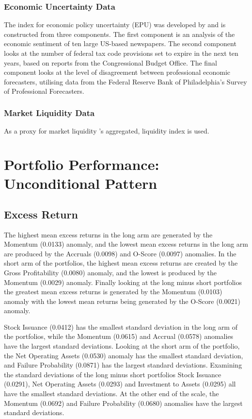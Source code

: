 \documentclass[12pt, a4paper, oneside]{article}
\begin{document}
\subsubsection{Economic Uncertainty Data}
The index for economic policy uncertainty (EPU) was developed by  and is constructed from three components. The first component is an analysis of the economic sentiment of ten large US-based newspapers. The second component looks at the number of federal tax code provisions set to expire in the next ten years, based on reports from the Congressional Budget Office. The final component looks at the level of disagreement between professional economic forecasters, utilising data from the Federal Reserve Bank of Philadelphia's Survey of Professional Forecasters.

\subsubsection{Market Liquidity Data}
As a proxy for market liquidity 's aggregated, liquidity index is used. 


\section{Portfolio Performance: Unconditional Pattern}\label{sec:unconditional}
\subsection{Excess Return }
The highest mean excess returns in the long arm are generated by the Momentum (0.0133) anomaly, and the lowest mean excess returns in the long arm are produced by the Accruals (0.0098) and O-Score (0.0097) anomalies. In the short arm of the portfolios, the highest mean excess returns are created by the Gross Profitability (0.0080) anomaly, and the lowest is produced by the Momentum (0.0029) anomaly. Finally looking at the long minus short portfolios the greatest mean excess returns is generated by the Momentum (0.0103) anomaly with the lowest mean returns being generated by the O-Score (0.0021) anomaly.

Stock Issuance (0.0412) has the smallest standard deviation in the long arm of the portfolios, while the Momentum (0.0615) and Accrual (0.0578) anomalies have the largest standard deviations. Looking at the short arm of the portfolio, the Net Operating Assets (0.0530) anomaly has the smallest standard deviation, and Failure Probability (0.0871) has the largest standard deviations. Examining the standard deviations of the long minus short portfolios Stock Issuance (0.0291), Net Operating Assets (0.0293) and Investment to Assets (0.0295) all have the smallest standard deviations. At the other end of the scale, the Momentum (0.0692) and Failure Probability (0.0680) anomalies have the largest standard deviations.
\end{document}
